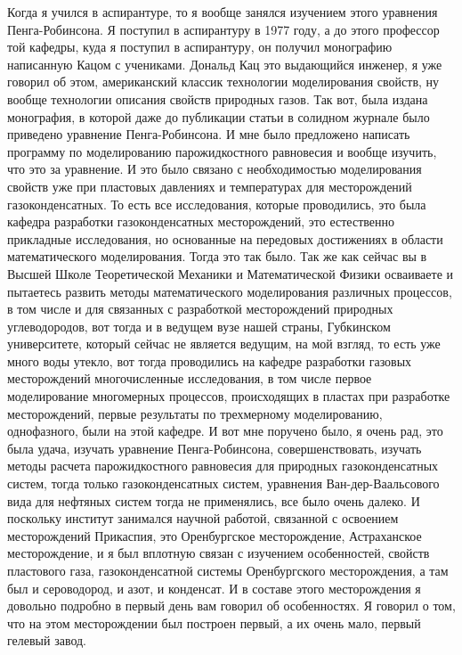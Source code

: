 \documentclass[main.tex]{subfiles}
\begin{document}
Когда я учился в аспирантуре, то я вообще занялся изучением этого уравнения Пенга-Робинсона.
Я поступил в аспирантуру в 1977 году, а до этого профессор той кафедры, куда я поступил в аспирантуру, он получил монографию написанную Кацом с учениками.
Дональд Кац это выдающийся инженер, я уже говорил об этом, американский классик технологии моделирования свойств, ну вообще технологии описания свойств природных газов.
Так вот, была издана монография, в которой даже до публикации статьи в солидном журнале было приведено уравнение Пенга-Робинсона.
И мне было предложено написать программу по моделированию парожидкостного равновесия и вообще изучить, что это за уравнение.
И это было связано с необходимостью моделирования свойств уже при пластовых давлениях и температурах для месторождений газоконденсатных.
То есть все исследования, которые проводились, это была кафедра разработки газоконденсатных месторождений, это естественно прикладные исследования, но основанные на передовых достижениях в области математического моделирования.
Тогда это так было.
Так же как сейчас вы в Высшей Школе Теоретической Механики и Математической Физики осваиваете и пытаетесь развить методы математического моделирования различных процессов, в том числе и для связанных с разработкой месторождений природных углеводородов, вот тогда и в ведущем вузе нашей страны, Губкинском университете, который сейчас не является ведущим, на мой взгляд, то есть уже много воды утекло, вот тогда проводились на кафедре разработки газовых месторождений многочисленные исследования, в том числе первое моделирование многомерных процессов, происходящих в пластах при разработке месторождений, первые результаты по трехмерному моделированию, однофазного, были на этой кафедре.
И вот мне поручено было, я очень рад, это была удача, изучать уравнение Пенга-Робинсона, совершенствовать, изучать методы расчета парожидкостного равновесия для природных газоконденсатных систем, тогда только газоконденсатных систем, уравнения Ван-дер-Ваальсового вида для нефтяных систем тогда не применялись, все было очень далеко.
И поскольку институт занимался научной работой, связанной с освоением месторождений Прикаспия, это Оренбургское месторождение, Астраханское месторождение, и я был вплотную связан с изучением особенностей, свойств пластового газа, газоконденсатной системы Оренбургского месторождения, а там был и сероводород, и азот, и конденсат.
И в составе этого месторождения я довольно подробно в первый день вам говорил об особенностях.
Я говорил о том, что на этом месторождении был построен первый, а их очень мало, первый гелевый завод.
\end{document}
